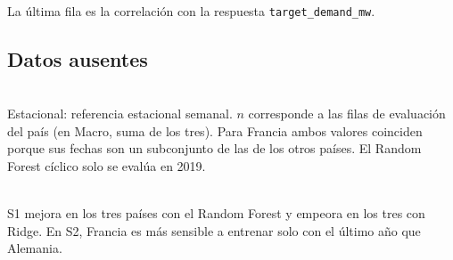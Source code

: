 \begin{table}[!htbp]
    \centering
        \caption{Correlación de Pearson entre los predictores numéricos y la respuesta en el entrenamiento final (2015--2018), calculada dentro de cada país y promediada entre los tres.\label{tab:correlacion}}
        \footnotesize
        \resizebox{\textwidth}{!}{}
    \\ La última fila es la correlación con la respuesta \texttt{target\_demand\_mw}.
\end{table}

\FloatBarrier
\subsection{Datos ausentes}

\begin{table}[!htbp]
    \centering
        \caption{Bloques de horas consecutivas sin demanda observada, por país (2015--2019).\label{tab:ausentes_bloques}}
        \small
        
\end{table}

\begin{table}[!htbp]
    \centering
        \caption{NMAE de cada país con sus casos completos (propio) y restringido a las fechas en que los tres países tienen caso completo (común).\label{tab:ausentes_efecto}}
        \footnotesize
        \resizebox{\textwidth}{!}{}
    \\ Estacional: referencia estacional semanal. $n$ corresponde a las filas de evaluación del país (en Macro, suma de los tres). Para Francia ambos valores coinciden porque sus fechas son un subconjunto de las de los otros países. El Random Forest cíclico solo se evalúa en 2019.
\end{table}

\begin{table}[!htbp]
    \centering
        \caption{Cambio del NMAE por país en los análisis de sensibilidad S1 y S2 (sección \ref{sec:sens}) frente al escenario base de cada modelo.\label{tab:sens_pais}}
        \small
        
    \\ S1 mejora en los tres países con el Random Forest y empeora en los tres con Ridge. En S2, Francia es más sensible a entrenar solo con el último año que Alemania.
\end{table}
